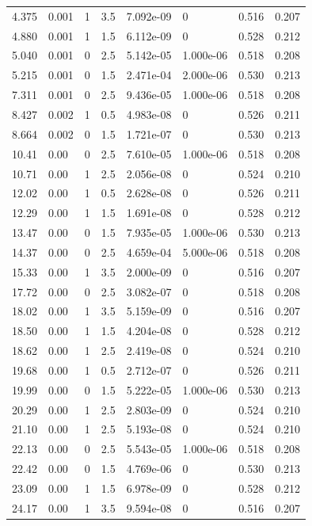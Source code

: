 \documentclass[preview]{standalone}
\begin{document}
{{\begin{tabular}{L{1.2cm}C{1.2cm} C{0.3cm}C{0.5cm} C{1.4cm}C{1.4cm} C{1.4cm}C{1.4cm}}
  4.375  &  0.001  & 1     & 3.5 &  7.092e-09  & 0  & 0.516 &  0.207   \\ 
  4.880  &  0.001  & 1     & 1.5 &  6.112e-09  & 0  & 0.528 &  0.212   \\ 
  5.040  &  0.001  & 0     & 2.5 &  5.142e-05  & 1.000e-06  & 0.518 &  0.208   \\ 
  5.215  &  0.001  & 0     & 1.5 &  2.471e-04  & 2.000e-06  & 0.530 &  0.213   \\ 
  7.311  &  0.001  & 0     & 2.5 &  9.436e-05  & 1.000e-06  & 0.518 &  0.208   \\ 
  8.427  &  0.002  & 1     & 0.5 &  4.983e-08  & 0  & 0.526 &  0.211   \\ 
  8.664  &  0.002  & 0     & 1.5 &  1.721e-07  & 0  & 0.530 &  0.213   \\ 
  10.41  &  0.00  & 0     & 2.5 &  7.610e-05  & 1.000e-06  & 0.518 &  0.208   \\ 
  10.71  &  0.00  & 1     & 2.5 &  2.056e-08  & 0  & 0.524 &  0.210   \\ 
  12.02  &  0.00  & 1     & 0.5 &  2.628e-08  & 0  & 0.526 &  0.211   \\ 
  12.29  &  0.00  & 1     & 1.5 &  1.691e-08  & 0  & 0.528 &  0.212   \\ 
  13.47  &  0.00  & 0     & 1.5 &  7.935e-05  & 1.000e-06  & 0.530 &  0.213   \\ 
  14.37  &  0.00  & 0     & 2.5 &  4.659e-04  & 5.000e-06  & 0.518 &  0.208   \\ 
  15.33  &  0.00  & 1     & 3.5 &  2.000e-09  & 0  & 0.516 &  0.207   \\ 
  17.72  &  0.00  & 0     & 2.5 &  3.082e-07  & 0  & 0.518 &  0.208   \\ 
  18.02  &  0.00  & 1     & 3.5 &  5.159e-09  & 0  & 0.516 &  0.207   \\ 
  18.50  &  0.00  & 1     & 1.5 &  4.204e-08  & 0  & 0.528 &  0.212   \\ 
  18.62  &  0.00  & 1     & 2.5 &  2.419e-08  & 0  & 0.524 &  0.210   \\ 
  19.68  &  0.00  & 1     & 0.5 &  2.712e-07  & 0  & 0.526 &  0.211   \\ 
  19.99  &  0.00  & 0     & 1.5 &  5.222e-05  & 1.000e-06  & 0.530 &  0.213   \\ 
  20.29  &  0.00  & 1     & 2.5 &  2.803e-09  & 0  & 0.524 &  0.210   \\ 
  21.10  &  0.00  & 1     & 2.5 &  5.193e-08  & 0  & 0.524 &  0.210   \\ 
  22.13  &  0.00  & 0     & 2.5 &  5.543e-05  & 1.000e-06  & 0.518 &  0.208   \\ 
  22.42  &  0.00  & 0     & 1.5 &  4.769e-06  & 0  & 0.530 &  0.213   \\ 
  23.09  &  0.00  & 1     & 1.5 &  6.978e-09  & 0  & 0.528 &  0.212   \\ 
  24.17  &  0.00  & 1     & 3.5 &  9.594e-08  & 0  & 0.516 &  0.207   \\ 
\hline 
\end{tabular} 

}}
\end{document}
